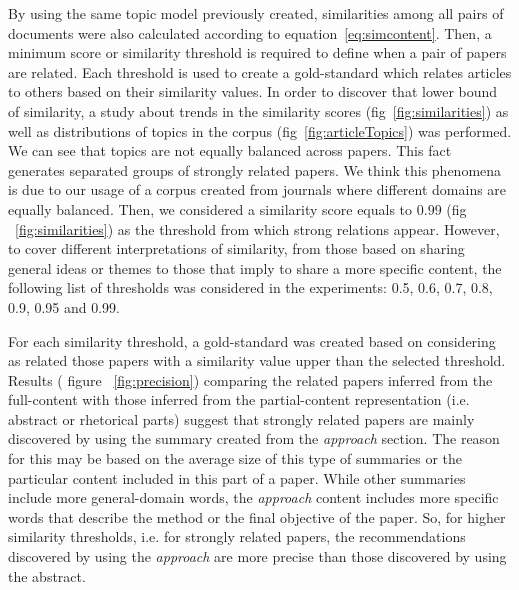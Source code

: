 By using the same topic model previously created, similarities among all pairs of documents were also calculated according to equation~\ref{eq:simcontent}. Then, a minimum score or similarity threshold is required to define when a pair of papers are related. Each threshold is used to create a gold-standard which relates articles to others based on their similarity values. In order to discover that lower bound of similarity, a study about trends in the similarity scores (fig~\ref{fig:similarities}) as well as distributions of topics in the corpus (fig~\ref{fig:articleTopics}) was performed. We can see that topics are not equally balanced across papers. This fact generates separated groups of strongly related papers. We think this phenomena is due to our usage of a corpus created from journals where different domains are equally balanced. Then, we considered a similarity score equals to $0.99$ (fig ~\ref{fig:similarities}) as the threshold from which strong relations appear. However, to cover different interpretations of similarity, from those based on sharing general ideas or themes to those that imply to share a more specific content, the following list of thresholds was considered in the experiments: 0.5, 0.6, 0.7, 0.8, 0.9, 0.95 and 0.99.


For each similarity threshold, a gold-standard was created based on considering as related those papers with a similarity value upper than the selected threshold. Results ( figure ~\ref{fig:precision}) comparing the related papers inferred from the full-content with those inferred from the partial-content representation (i.e. abstract or rhetorical parts) suggest that strongly related papers are mainly discovered by using the summary created from the \textit{approach} section. The reason for this may be based on the average size of this type of summaries or the particular content included in this part of a paper. While other summaries include more general-domain words, the \textit{approach} content includes more specific words that describe the method or the final objective of the paper. So, for higher similarity thresholds, i.e. for strongly related papers, the recommendations discovered by using the \textit{approach} are more precise than those discovered by using the abstract.

